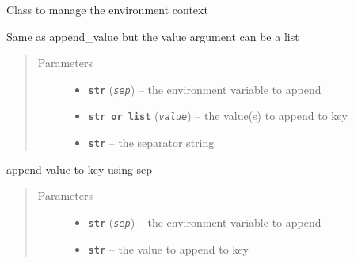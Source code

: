 \documentclass[a4paper,10pt,english]{sphinxmanual}
\begin{document}
\begin{fulllineitems}
\label{commands/apidoc/src:src.environment.Environ}
Class to manage the environment context

\begin{fulllineitems}
\label{commands/apidoc/src:src.environment.Environ.append}
Same as append\_value but the value argument can be a list
\begin{quote}\begin{description}
\item[{Parameters}] \leavevmode\begin{itemize}
\item {} 
\textbf{\texttt{str}} (\emph{\texttt{sep}}) -- the environment variable to append

\item {} 
\textbf{\texttt{str or list}} (\emph{\texttt{value}}) -- the value(s) to append to key

\item {} 
\textbf{\texttt{str}} -- the separator string

\end{itemize}

\end{description}\end{quote}

\end{fulllineitems}


\begin{fulllineitems}
\label{commands/apidoc/src:src.environment.Environ.append_value}
append value to key using sep
\begin{quote}\begin{description}
\item[{Parameters}] \leavevmode\begin{itemize}
\item {} 
\textbf{\texttt{str}} (\emph{\texttt{sep}}) -- the environment variable to append

\item {} 
\textbf{\texttt{str}} -- the value to append to key


\end{itemize}
\end{description}
\end{quote}
\end{fulllineitems}
\end{fulllineitems}
\end{document}
